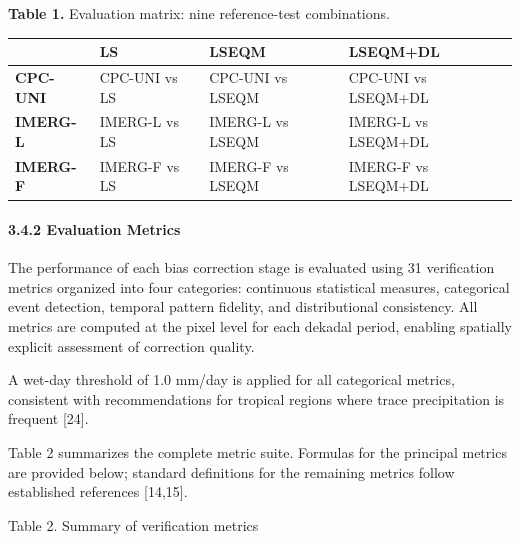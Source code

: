 \documentclass[
]{article}
\begin{document}
\textbf{Table 1.} Evaluation matrix: nine reference-test combinations.

\begin{longtable}[]{@{}llll@{}}
\toprule\noalign{}
& \textbf{LS} & \textbf{LSEQM} & \textbf{LSEQM+DL} \\
\midrule\noalign{}
\endhead
\bottomrule\noalign{}
\endlastfoot
\textbf{CPC-UNI} & CPC-UNI vs LS & CPC-UNI vs LSEQM & CPC-UNI vs
LSEQM+DL \\
\textbf{IMERG-L} & IMERG-L vs LS & IMERG-L vs LSEQM & IMERG-L vs
LSEQM+DL \\
\textbf{IMERG-F} & IMERG-F vs LS & IMERG-F vs LSEQM & IMERG-F vs
LSEQM+DL \\
\end{longtable}

\paragraph{3.4.2 Evaluation Metrics}\label{evaluation-metrics}

The performance of each bias correction stage is evaluated using 31
verification metrics organized into four categories: continuous
statistical measures, categorical event detection, temporal pattern
fidelity, and distributional consistency. All metrics are computed at
the pixel level for each dekadal period, enabling spatially explicit
assessment of correction quality.

A wet-day threshold of 1.0 mm/day is applied for all categorical
metrics, consistent with recommendations for tropical regions where
trace precipitation is frequent {[}24{]}.

Table 2 summarizes the complete metric suite. Formulas for the principal
metrics are provided below; standard definitions for the remaining
metrics follow established references {[}14,15{]}.

Table 2. Summary of verification metrics
\end{document}
